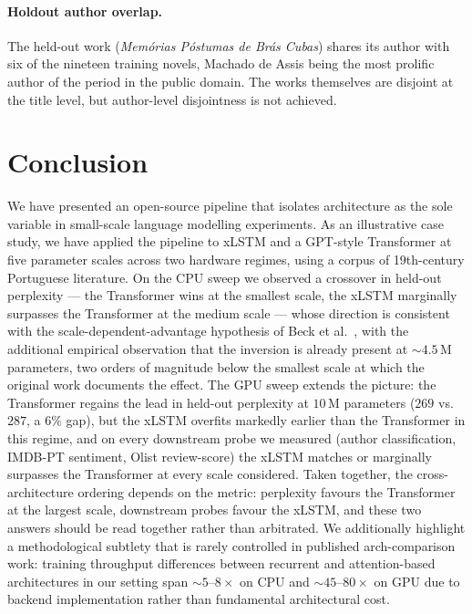 \documentclass[11pt]{article}
\begin{document}
\paragraph{Holdout author overlap.}
The held-out work (\emph{Memórias Póstumas de Brás Cubas}) shares its
author with six of the nineteen training novels, Machado de Assis being
the most prolific author of the period in the public domain. The works
themselves are disjoint at the title level, but author-level disjointness
is not achieved.

\section{Conclusion}

We have presented an open-source pipeline that isolates architecture as
the sole variable in small-scale language modelling experiments. As an
illustrative case study, we have applied the pipeline to xLSTM and a
GPT-style Transformer at five parameter scales across two hardware
regimes, using a corpus of 19th-century Portuguese literature. On the
CPU sweep we observed a crossover in held-out perplexity --- the
Transformer wins at the smallest scale, the xLSTM marginally surpasses
the Transformer at the medium scale --- whose direction is consistent
with the scale-dependent-advantage hypothesis of Beck et
al.~\cite{beck2024}, with the additional empirical observation that
the inversion is already present at $\sim$$4.5$\,M parameters, two
orders of magnitude below the smallest scale at which the original
work documents the effect. The GPU sweep extends the picture: the
Transformer regains the lead in held-out perplexity at $10$\,M
parameters ($269$ vs.\ $287$, a $6\%$ gap), but the xLSTM overfits
markedly earlier than the Transformer in this regime, and on every
downstream probe we measured (author classification, IMDB-PT
sentiment, Olist review-score) the xLSTM matches or marginally
surpasses the Transformer at every scale considered. Taken together,
the cross-architecture ordering depends on the metric: perplexity
favours the Transformer at the largest scale, downstream probes favour
the xLSTM, and these two answers should be read together rather than
arbitrated. We additionally highlight a methodological subtlety that is
rarely controlled in published arch-comparison work: training
throughput differences between recurrent and attention-based
architectures in our setting span $\sim$$5$--$8\times$ on CPU and
$\sim$$45$--$80\times$ on GPU due to backend implementation rather than
fundamental architectural cost.
\end{document}
